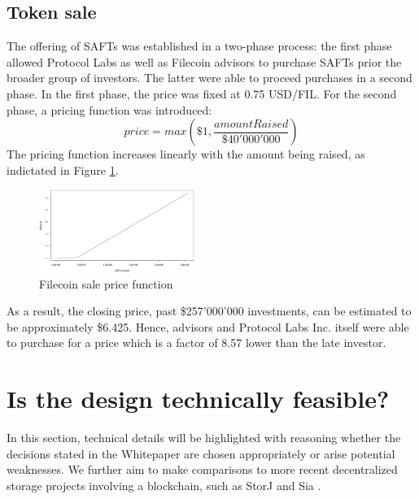 \documentclass[conference]{IEEEtran}
\begin{document}
\subsection{Token sale}
\label{subsec:token-sale}
The offering of SAFTs was established in a two-phase process: the first phase allowed Protocol Labs as well as Filecoin advisors to purchase SAFTs prior the broader group of investors. 
The latter were able to proceed purchases in a second phase.
In the first phase, the price was fixed at 0.75 USD/FIL.
For the second phase, a pricing function was introduced:
\[ price = max(\$1, \frac{amountRaised}{\$40'000'000}) \]
The pricing function increases linearly with the amount being raised, as indictated in Figure \ref{fig:sale-price}.
\begin{figure}[h]
\centering
\includegraphics[width=0.45\textwidth]{filecoin-tokensale.png}
\caption{Filecoin sale price function}
\label{fig:sale-price}
\end{figure}
As a result, the closing price, past \$257'000'000 investments, can be estimated to be approximately \$6.425.
Hence, advisors and Protocol Labs Inc. itself were able to purchase for a price which is a factor of 8.57 lower than the late investor.

\section{Is the design technically feasible?}
\label{sec:tech-feasibility}
In this section, technical details will be highlighted with reasoning whether the decisions stated in the Whitepaper\cite{filecoin} are chosen appropriately or arise potential weaknesses.
We further aim to make comparisons to more recent decentralized storage projects involving a blockchain, such as StorJ \cite{storj} and Sia \cite{sia}.
\end{document}
